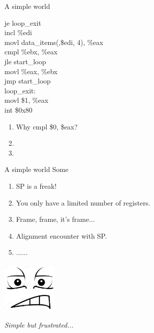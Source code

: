 \documentclass[UKenglish]{beamer}
\begin{document}
\begin{frame}{A simple world}
  \begin{example}
    je loop\_exit\\
    incl \%edi\\
    movl data\_items(,\$edi, 4), \%eax\\
    cmpl \%ebx, \%eax\\
    jle start\_loop\\
    movl \%eax, \%ebx\\
    jmp start\_loop\\
    loop\_exit:\\
    movl \$1, \%eax\\
    int \$0x80\\
  \end{example}
  \begin{enumerate}
    \pause
  \item Why cmpl \$0, \$eax? \pause \color{red}{the last item of data\_items}
    \pause
  \item \color{black}{How to check result?} \pause \color{red}{echo \$?}
    \pause
  \item \color{black}{How to pass the result to next function?} \pause \color{red}{Euh...next section}
  \end{enumerate}
\end{frame}

\begin{frame}{A simple world}
  Some \color{red}{caveat}
  \begin{enumerate}
  \item SP is a freak!
  \item You only have a limited number of registers.
  \item Frame, frame, it's frame...
  \item Alignment encounter with SP.
  \item ......
  \end{enumerate}
  \begin{center}
    \includegraphics[width = 0.2\textwidth, height=2.5cm]{grimace.jpg}
  \end{center}
  \begin{center}
    \Large \emph{Simple but frustrated...}
  \end{center}
\end{frame}
\end{document}
